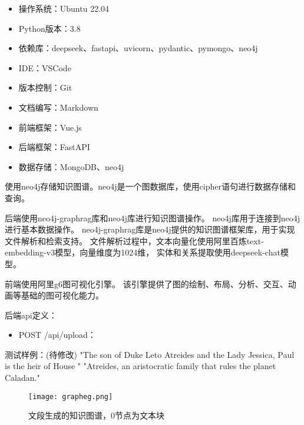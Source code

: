 \documentclass{xmu}
\begin{document}
        \begin{itemize}
            \item 操作系统：Ubuntu 22.04
            \item Python版本：3.8
            \item 依赖库：deepseek、fastapi、uvicorn、pydantic、pymongo、neo4j
        \end{itemize}
        \begin{itemize}
            \item IDE：VSCode
            \item 版本控制：Git
            \item 文档编写：Markdown
        \end{itemize}
        \begin{itemize}
            \item 前端框架：Vue.js
            \item 后端框架：FastAPI
            \item 数据存储：MongoDB、neo4j
        \end{itemize}
        使用neo4j存储知识图谱。neo4j是一个图数据库，使用cipher语句进行数据存储和查询。\par
        后端使用neo4j-graphrag库和neo4j库进行知识图谱操作。
        neo4j库用于连接到neo4j进行基本数据操作。
        neo4j-graphrag库是neo4j提供的知识图谱框架库，用于实现文件解析和检索支持。
        文件解析过程中，文本向量化使用阿里百炼text-embedding-v3模型，向量维度为1024维，
        实体和关系提取使用deepseek-chat模型。

        前端使用阿里g6图可视化引擎。
        该引擎提供了图的绘制、布局、分析、交互、动画等基础的图可视化能力。

        后端api定义：
        \begin{itemize}
            \item POST /api/upload：
        \end{itemize}

        测试样例：(待修改)
        "The son of Duke Leto Atreides and the Lady Jessica, Paul is the heir of House "
        "Atreides, an aristocratic family that rules the planet Caladan."
        \begin{figure}[!htb]
            \centering
            \texttt{[image: grapheg.png]}\\
            \caption{文段生成的知识图谱，0节点为文本块}\label{}
        \end{figure}
\end{document}
